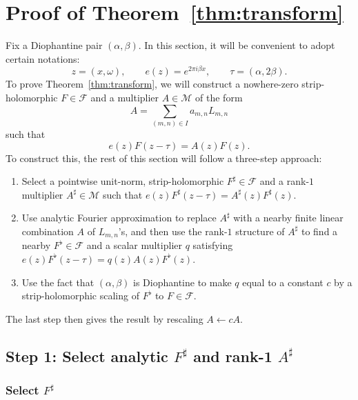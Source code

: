 \documentclass[10pt,a4paper]{amsart}
\begin{document}
\section{Proof of Theorem~\ref{thm:transform}}
\label{sec:main proof}

Fix a Diophantine pair $(\alpha,\beta)$.
In this section, it will be convenient to adopt certain notations:
\[
z=(x,\omega),
\qquad
e(z)=e^{2\pi i \beta x},
\qquad
\tau=(\alpha,2\beta).
\]
To prove Theorem~\ref{thm:transform}, we will construct a nowhere-zero strip-holomorphic $F\in\mathcal{F}$ and a multiplier $A\in\mathcal{M}$ of the form
\[
  A=\sum_{(m,n)\in I}a_{m,n}L_{m,n}
\]
such that
\begin{equation}
\label{eq.transformed equation}
e(z)F(z-\tau)=A(z)F(z).
\end{equation}
To construct this, the rest of this section will follow a three-step approach:
\begin{enumerate}
\item 
Select a pointwise unit-norm, strip-holomorphic $F^\sharp\in\mathcal{F}$ and a
rank-$1$ multiplier $A^\sharp\in\mathcal{M}$
such that
$e(z)F^\sharp(z-\tau)=A^\sharp(z)F^\sharp(z)$.
\item
Use analytic Fourier approximation to replace $A^\sharp$ with
a nearby finite linear combination $A$ of $L_{m,n}$'s, and then use the
rank-$1$ structure of $A^\sharp$ to find a nearby $F^\flat\in\mathcal{F}$ and a scalar
multiplier $q$ satisfying
$e(z)F^\flat(z-\tau)=q(z)A(z)F^\flat(z)$.
\item
Use the fact that $(\alpha,\beta)$ is Diophantine to make $q$ equal to a constant $c$ by a
strip-holomorphic scaling of $F^\flat$ to $F\in\mathcal{F}$.
\end{enumerate}
The last step then gives the result by rescaling $A\leftarrow cA$.

\subsection{Step 1: Select analytic \texorpdfstring{$F^\sharp$}{F-sharp}
and rank-1 \texorpdfstring{$A^\sharp$}{A-sharp}}

\subsubsection{Select $F^\sharp$}
\end{document}

